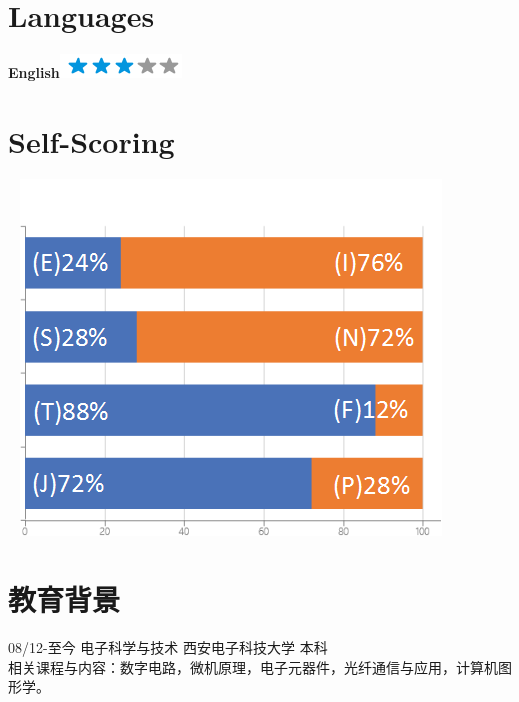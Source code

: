 \documentclass[]{friggeri-cv}
\begin{document}
\newpage


\begin{aside}
~
~
  \section{Languages}
    \textbf{English}\includegraphics[scale=0.40]{img/3stars.png}
  ~    
    \section{Self-Scoring}
    ~
    \includegraphics[scale=0.32]{img/personal.png}
    ~
\end{aside}




\section{教育背景}
08/12\hspace{1mm}-\hspace{1mm}至今 \hspace{30mm} 电子科学与技术 \hspace{7mm}  西安电子科技大学  \hspace{7mm}  本科 \\

相关课程与内容：数字电路，微机原理，电子元器件，光纤通信与应用，计算机图形学。\\
\end{document}
